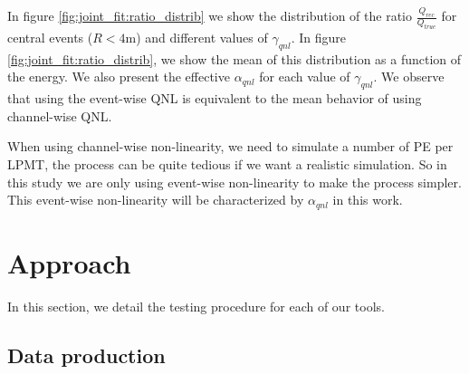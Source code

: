 \documentclass[../main.tex]{subfiles}
\begin{document}
In figure \ref{fig:joint_fit:ratio_distrib} we show the distribution of the ratio $\frac{Q_{rec}}{Q_{true}}$ for central events ($R < 4$m) and different values of $\gamma_{qnl}$. In figure \ref{fig:joint_fit:ratio_distrib}, we show the mean of this distribution as a function of the energy. We also present the effective $\alpha_{qnl}$ for each value of $\gamma_{qnl}$. We observe that using the event-wise QNL is equivalent to the mean behavior of using channel-wise QNL.

When using channel-wise non-linearity, we need to simulate a number of PE per LPMT, the process can be quite tedious if we want a realistic simulation. So in this study we are only using event-wise non-linearity to make the process simpler. This event-wise non-linearity will be characterized by $\alpha_{qnl}$ in this work.

%
%
%

\section{Approach}
\label{sec:joint_fit:approach}

In this section, we detail the testing procedure for each of our tools.

%
%

\subsection{Data production}
\end{document}
